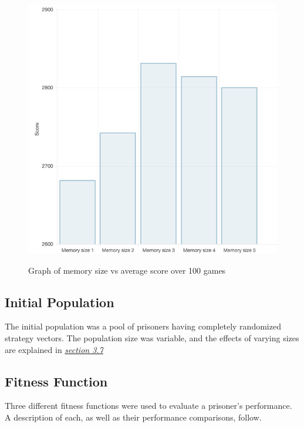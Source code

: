 \documentclass[12pt]{article}
\begin{document}
\begin{figure}[h]
    \centering
    \includegraphics[scale=0.6]{figures/memsize-vs-score.png}
    \label{fig1}
    \caption{Graph of memory size vs average score over 100 games}
\end{figure}

\subsection{Initial Population}
The initial population was a pool of prisoners having completely randomized
strategy vectors.  The population size was variable, and the effects of varying
sizes are explained in \textit{\hyperref[vpg]{section 3.7}}

\subsection{Fitness Function}

Three different fitness functions were used to evaluate a prisoner's performance.
A description of each, as well as their performance comparisons, follow.
\end{document}
